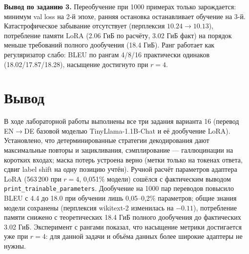 \documentclass[14pt,a4paper]{extarticle}
\begin{document}
\textbf{Вывод по заданию 3.} Переобучение при 1000 примерах только зарождается:
минимум val loss на 2-й эпохе, ранняя остановка останавливает обучение на 3-й.
Катастрофическое забывание отсутствует (перплексия $10.24 \to 10.13$), потребление
памяти LoRA (2.06 ГиБ по расчёту, 3.02 ГиБ факт) на порядок меньше требований полного
дообучения (18.4 ГиБ). Ранг работает как регуляризатор слабо: BLEU по рангам
4/8/16 практически одинаков (18.02/17.87/18.28), насыщение достигнуто при $r=4$.

\section{Вывод}

В ходе лабораторной работы выполнены все три задания варианта 16 (перевод EN$\to$DE
базовой моделью TinyLlama-1.1B-Chat и её дообучение LoRA). Установлено, что
детерминированные стратегии декодирования дают максимальные повторы и зацикливания,
сэмплирование --- галлюцинации на коротких входах; маска потерь устроена верно
(метки только на токенах ответа, сдвиг label shift на одну позицию учтён).
Ручной расчёт параметров адаптера LoRA (563\,200 при $r=4$, 0,051\% модели) сошёлся
с фактическим выводом \texttt{print\_trainable\_parameters}. Дообучение на 1000 пар
переводов повысило BLEU с 4.4 до 18.0 при обучении лишь 0,05--0,2\% параметров;
общие знания модели сохранены (перплексия wikitext-2 изменилась на $-0.11$),
потребление памяти снижено с теоретических 18.4 ГиБ полного дообучения до
фактических 3.02 ГиБ. Эксперимент с рангами показал, что насыщение метрики
достигается уже при $r=4$: для данной задачи и объёма данных более широкие
адаптеры не нужны.
\end{document}
